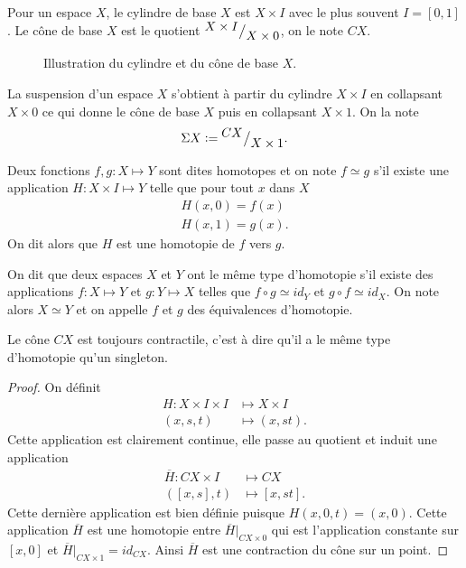 \documentclass[main.tex]{subfiles}
\begin{document}
	\begin{definition}
		Pour un espace $X$, le cylindre de base $X$ est $X \times I$ avec le plus souvent $I = [0,1]$.
		Le cône de base $X$ est le quotient ${^{\textstyle X\times I}\big/_{\textstyle X \times 0}}$, on le note $CX$.
	\end{definition}

	\begin{figure}[!ht]
	    \centering
	    \caption{Illustration du cylindre et du cône de base $X$.}
	\end{figure}

	\begin{definition}[Suspension]
		La suspension d'un espace $X$ s'obtient à partir du cylindre $X \times I$ en collapsant $X \times 0$ ce qui donne le cône de base $X$ puis en collapsant $X \times 1$. On la note \[
			\Sigma X \vcentcolon= {^{\textstyle CX}\big/_{\textstyle X \times 1}}
		.\] 	
	\end{definition}

	\begin{definition}[Homotopie]
		Deux fonctions $f,g : X \longmapsto Y$ sont dites homotopes et on note $f \simeq g$ s'il existe une application $H : X \times I \longmapsto Y$ telle que pour tout $x$ dans $X$ 
		\begin{align*}
			H(x,0) = f(x) \\
			H(x,1) = g(x)
		.\end{align*} On dit alors que $H$ est une homotopie de $f$ vers $g$.
	\end{definition}

	\begin{definition}
		On dit que deux espaces $X$ et $Y$ ont le même type d'homotopie s'il existe des applications $f : X \longmapsto Y$ et $g : Y \longmapsto X$ telles que $f \circ g \simeq id_Y$ et $g \circ f \simeq id_X$. On note alors $X \simeq Y$ et on appelle $f$ et $g$ des équivalences d'homotopie.	
	\end{definition}

	\begin{prop}
		Le cône $CX$ est toujours contractile, c'est à dire qu'il a le même type d'homotopie qu'un singleton.	
	\end{prop}
	\begin{proof}
		On définit 
		\begin{align*}
			H : X \times I \times I &\longmapsto X \times I \\
			(x,s,t) &\longmapsto (x,st)
		.\end{align*}
		Cette application est clairement continue, elle passe au quotient et induit une application
		\begin{align*}
			\overline{H} : CX \times I &\longmapsto CX \\
			([x,s],t) &\longmapsto [x,st]
		.\end{align*}
		Cette dernière application est bien définie puisque $H(x,0,t) = (x,0)$. Cette application  $\overline{H}$ est une homotopie entre $\overline{H} \vert_{CX \times 0}$
		qui est l'application constante sur $[x,0]$ et $\overline{H} \vert _{CX \times 1} = id_{CX}$.
		Ainsi $\overline{H}$ est une contraction du cône sur un point.
	\end{proof}
\end{document}
